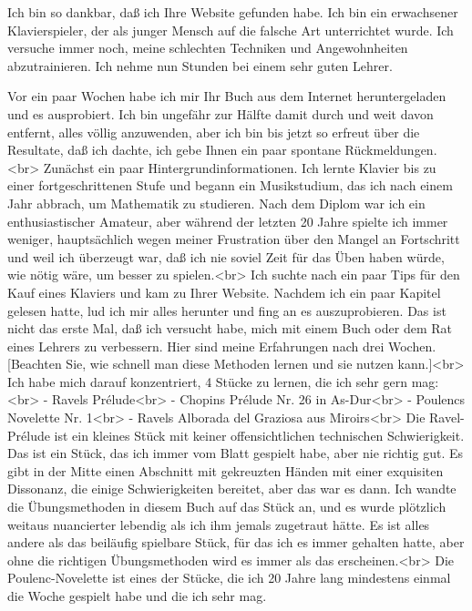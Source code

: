 \item \label{testimonials08}
Ich bin so dankbar, daß ich Ihre Website gefunden habe.
Ich bin ein erwachsener Klavierspieler, der als junger Mensch auf die falsche Art unterrichtet wurde.
Ich versuche immer noch, meine schlechten Techniken und Angewohnheiten abzutrainieren.
Ich nehme nun Stunden bei einem sehr guten Lehrer.


\item \label{testimonials09}
Vor ein paar Wochen habe ich mir Ihr Buch aus dem Internet heruntergeladen und es ausprobiert.
Ich bin ungefähr zur Hälfte damit durch und weit davon entfernt, alles völlig anzuwenden, aber ich bin bis jetzt so erfreut über die Resultate, daß ich dachte, ich gebe Ihnen ein paar spontane Rückmeldungen.<br>
Zunächst ein paar Hintergrundinformationen.
Ich lernte Klavier bis zu einer fortgeschrittenen Stufe und begann ein Musikstudium, das ich nach einem Jahr abbrach, um Mathematik zu studieren.
Nach dem Diplom war ich ein enthusiastischer Amateur, aber während der letzten 20 Jahre spielte ich immer weniger, hauptsächlich wegen meiner Frustration über den Mangel an Fortschritt und weil ich überzeugt war, daß ich nie soviel Zeit für das Üben haben würde, wie nötig wäre, um besser zu spielen.<br>
Ich suchte nach ein paar Tips für den Kauf eines Klaviers und kam zu Ihrer Website.
Nachdem ich ein paar Kapitel gelesen hatte, lud ich mir alles herunter und fing an es auszuprobieren.
Das ist nicht das erste Mal, daß ich versucht habe, mich mit einem Buch oder dem Rat eines Lehrers zu verbessern.
Hier sind meine Erfahrungen nach drei Wochen.
[Beachten Sie, wie schnell man diese Methoden lernen und sie nutzen kann.]<br>
Ich habe mich darauf konzentriert, 4 Stücke zu lernen, die ich sehr gern mag:<br>
- Ravels Prélude<br>
- Chopins Prélude Nr. 26 in As-Dur<br>
- Poulencs Novelette Nr. 1<br>
- Ravels Alborada del Graziosa aus Miroirs<br>
Die Ravel-Prélude ist ein kleines Stück mit keiner offensichtlichen technischen Schwierigkeit.
Das ist ein Stück, das ich immer vom Blatt gespielt habe, aber nie richtig gut.
Es gibt in der Mitte einen Abschnitt mit gekreuzten Händen mit einer exquisiten Dissonanz, die einige Schwierigkeiten bereitet, aber das war es dann.
Ich wandte die Übungsmethoden in diesem Buch auf das Stück an, und es wurde plötzlich weitaus nuancierter lebendig als ich ihm jemals zugetraut hätte.
Es ist alles andere als das beiläufig spielbare Stück, für das ich es immer gehalten hatte, aber ohne die richtigen Übungsmethoden wird es immer als das erscheinen.<br>
Die Poulenc-Novelette ist eines der Stücke, die ich 20 Jahre lang mindestens einmal die Woche gespielt habe und die ich sehr mag.

